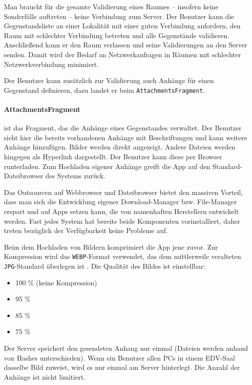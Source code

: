 Man braucht für die gesamte Validierung eines Raumes -- insofern keine
Sonderfälle auftreten -- keine Verbindung zum Server. Der Benutzer kann
die Gegenstandsliste an einer Lokalität mit einer guten Verbindung
anfordern, den Raum mit schlechter Verbindung betreten und alle
Gegenstände validieren. Anschließend kann er den Raum verlassen und
seine Validierungen an den Server senden. Damit wird der Bedarf an
Netzwerkanfragen in Räumen mit schlechter Netzwerkverbindung minimiert.

Der Benutzer kann zusätzlich zur Validierung auch Anhänge für einen
Gegenstand definieren, dazu landet er beim \texttt{AttachmentsFragment}.

\hypertarget{attachmentsfragment}{%
\paragraph{AttachmentsFragment}\label{attachmentsfragment}}

ist das Fragment, das die Anhänge eines Gegenstandes verwaltet. Der
Benutzer sieht hier die bereits vorhandenen Anhänge mit Beschriftungen
und kann weitere Anhänge hinzufügen. Bilder werden direkt angezeigt.
Andere Dateien werden hingegen als Hyperlink dargestellt. Der Benutzer
kann diese per Browser runterladen. Zum Hochladen eigener Anhänge greift
die App auf den Standard-Dateibrowser des Systems zurück.

Das Outsourcen auf Webbrowser und Dateibrowser bietet den massiven
Vorteil, dass man sich die Entwicklung eigener Download-Manager bzw.
File-Manager erspart und auf Apps setzen kann, die von namenhaften
Herstellern entwickelt werden. Fast jedes System hat bereits beide
Komponenten vorinstalliert, daher treten bezüglich der Verfügbarkeit
keine Probleme auf.

Beim dem Hochladen von Bildern komprimiert die App jene zuvor. Zur
Kompression wird das \texttt{WEBP}-Format verwendet, das dem
mittlerweile veralteten \texttt{JPG}-Standard überlegen ist \cite{webp}.
Die Qualität des Bildes ist einstellbar:

\begin{itemize}
\tightlist
\item
  100 \% (keine Kompression)
\item
  95 \%
\item
  85 \%
\item
  75 \%
\end{itemize}

Der Server speichert den gesendeten Anhang nur einmal (Dateien werden
anhand von Hashes unterschieden). Wenn ein Benutzer allen PCs in einem
EDV-Saal dasselbe Bild zuweist, wird es nur einmal am Server hinterlegt.
Die Anzahl der Anhänge ist nicht limitiert.

